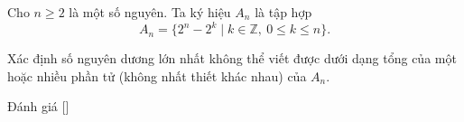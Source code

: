 \ifshowproblem
\begin{problem}\label{problem:FRA-2015-TST3-P5}
    Cho $n \geq 2$ là một số nguyên. Ta ký hiệu $A_n$ là tập hợp  
    \[
        A_n = \{2^n - 2^k \mid k \in \mathbb{Z},\ 0 \leq k \leq n\}.
    \]  

    Xác định số nguyên dương lớn nhất không thể viết được dưới dạng tổng của một hoặc nhiều phần tử (không nhất thiết khác nhau) của $A_n$.
\end{problem}
\fi

\ifshowinfo
Đánh giá [\textbf{}]
\fi